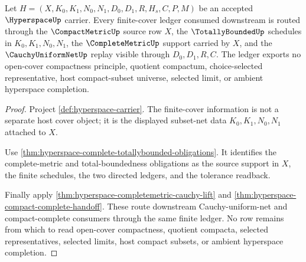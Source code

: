 \begin{theorem}
\label{thm:hyperspace-finite-cover-ledger}
Let $H=(X,K_0,K_1,N_0,N_1,D_0,D_1,R,H_s,C,P,M)$ be an accepted $\HyperspaceUp$ carrier. Every finite-cover ledger consumed downstream is routed through the $\CompactMetricUp$ source row $X$, the $\TotallyBoundedUp$ schedules in $K_0,K_1,N_0,N_1$, the $\CompleteMetricUp$ support carried by $X$, and the $\CauchyUniformNetUp$ replay visible through $D_0,D_1,R,C$. The ledger exports no open-cover compactness principle, quotient compactum, choice-selected representative, host compact-subset universe, selected limit, or ambient hyperspace completion.
\end{theorem}
\begin{proof}
Project \autoref{def:hyperspace-carrier}. The finite-cover information is not a separate host cover object; it is the displayed subset-net data $K_0,K_1,N_0,N_1$ attached to $X$.

Use \autoref{thm:hyperspace-complete-totallybounded-obligations}. It identifies the complete-metric and total-boundedness obligations as the source support in $X$, the finite schedules, the two directed ledgers, and the tolerance readback.

Finally apply \autoref{thm:hyperspace-completemetric-cauchy-lift} and \autoref{thm:hyperspace-compact-complete-handoff}. These route downstream Cauchy-uniform-net and compact-complete consumers through the same finite ledger. No row remains from which to read open-cover compactness, quotient compacta, selected representatives, selected limits, host compact subsets, or ambient hyperspace completion.
\end{proof}

